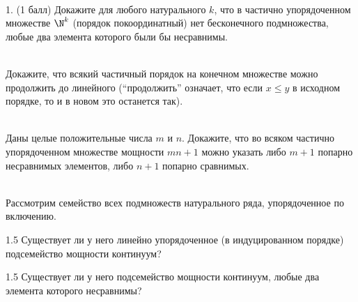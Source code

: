 \documentclass[a4paper,12pt,twoside]{article}
\begin{document}
\begin{?}\ \\
     1. (1 балл) Докажите для любого натурального $k$, что в частично упорядоченном множестве $\N^k$ (порядок покоординатный) нет бесконечного подмножества, любые два элемента которого были бы несравнимы.
\end{?}
\begin{?}\ \\
     Докажите, что всякий частичный порядок на конечном множестве можно продолжить до линейного (\enquote{продолжить} означает, что если $x \leq y$ в исходном  порядке, то и в новом это останется так).
\end{?}
\begin{?}\ \\
     Даны целые положительные числа $m$ и $n$. Докажите, что во всяком частично упорядоченном множестве мощности $mn + 1$ можно указать либо $m + 1$ попарно несравнимых элементов, либо $n + 1$ попарно сравнимых.
\end{?}
\begin{?}\ \\
    Рассмотрим семейство всех подмножеств натурального ряда, упорядоченное по включению.
    \begin{tasklist}
        \item[1.5]  Существует ли у него линейно упорядоченное (в индуцированном порядке) подсемейство мощности континуум?
        \item[1.5] Существует ли у него подсемейство мощности континуум, любые два элемента которого несравнимы?
    \end{tasklist}
\end{?}
\end{document}
